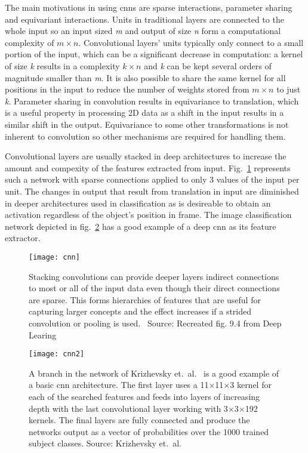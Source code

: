 The main motivations in using \ac{cnn}s are sparse interactions, parameter sharing and equivariant interactions. Units in traditional layers are connected to the whole input so an input sized \textit{m} and output of size \textit{n} form a computational complexity of $m \times n$. Convolutional layers' units typically only connect to a small portion of the input, which can be a significant decrease in computation: a kernel of size \textit{k} results in a complexity $k \times n$ and \textit{k} can be kept several orders of magnitude smaller than \textit{m}. It is also possible to share the same kernel for all positions in the input to reduce the number of weights stored from $m \times n$ to just \textit{k}. Parameter sharing in convolution results in equivariance to translation, which is a useful property in processing 2D data as a shift in the input results in a similar shift in the output. Equivariance to some other transformations is not inherent to convolution so other mechanisms are required for handling them.

Convolutional layers are usually stacked in deep architectures to increase the amount and compexity of the features extracted from input. Fig.~\ref{fig:scon} represents such a network with sparse connections applied to only 3 values of the input per unit. The changes in output that result from translation in input are diminished in deeper architectures used in classification as is desireable to obtain an activation regardless of the object's position in frame. The image classification network depicted in fig.~\ref{fig:cnn} has a good example of a deep \ac{cnn} as its feature extractor.

\begin{figure}[H]
\centering
\texttt{[image: cnn]}
\caption{Stacking convolutions can provide deeper layers indirect connections to most or all of the input data even though their direct connections are sparse. This forms hierarchies of features that are useful for capturing larger concepts and the effect increases if a strided convolution or pooling is used.~\cite{DEEP_LEARNING} Source: Recreated fig. 9.4 from Deep Learing~\cite{DEEP_LEARNING}}\label{fig:scon}
\end{figure}

\begin{figure}[H]
\centering
\texttt{[image: cnn2]}
\caption{A branch in the network of Krizhevsky et.~al.~\cite{NIPS_IMAGENET} is a good example of a basic \ac{cnn} architecture. The first layer uses a 11$\times$11$\times$3 kernel for each of the searched features and feeds into layers of increasing depth with the last convolutional layer working with 3$\times$3$\times$192 kernels. The final layers are fully connected and produce the networks output as a vector of probabilities over the 1000 trained subject classes. Source: Krizhevsky et.~al.~\cite{NIPS_IMAGENET}}\label{fig:cnn}
\end{figure}

